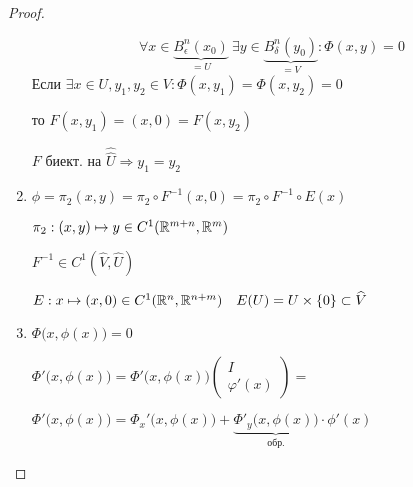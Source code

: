 \begin{proof}
\begin{enumerate}
                \[
                      \forall x \in \underbrace{B_\epsilon^n(x_0)}_{= U} \ \exists y \in \underbrace{B_\delta^n(y_0)}_{= V} : \Phi(x, y) = 0
                \]
                Если $\exists x \in U, y_1, y_2 \in V : \Phi(x, y_1) = \Phi(x, y_2) = 0$
                \par \quad то $F(x, y_1) = (x, 0) = F(x, y_2)$
                \par \quad \quad $F$ биект. на $\widehat{\widehat U} \Rightarrow y_1 = y_2$ %
            \item $\phi = \pi_2(x, y) = \pi_2 \circ F^{-1}(x, 0) = \pi_2 \circ F^{-1} \circ E(x)$
                \par $\pi_2 : (x, y) \mapsto y \in C^1(\mathbb{R}^{m+n}, \mathbb{R}^m)$
                \par $F^{-1} \in C^1(\widehat V, \widehat U)$
                \par $E  : x \mapsto (x, 0) \in C^1(\mathbb{R}^n, \mathbb{R}^{n+m}) \quad E(U) = U \times \{0\} \subset \widehat V$
            \item $\Phi\big(x, \phi(x)\big) = 0$
                \par $\Phi'\big(x, \phi(x)\big) = \Phi'\big(x, \phi(x)\big) \begin{pmatrix}
                    I \\ \varphi'(x)\end{pmatrix} = $
                \par $\Phi'\big(x, \phi(x)\big) = \Phi_x'\big(x, \phi(x)\big) + \underbrace{\Phi'_y\big(x, \phi(x)\big)}_{\text{обр.}} \cdot \phi'(x)$ 
        \end{enumerate}
    \end{proof}

